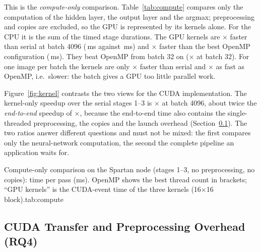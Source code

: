 This is the \emph{compute-only} comparison. Table~\ref{tab:compute} compares only the computation of the hidden layer, the output layer and the argmax; preprocessing and copies are excluded, so the GPU is represented by its kernels alone. For the CPU it is the sum of the timed stage durations. The GPU kernels are $\times$ faster than serial at batch 4096 (\,ms against \,ms) and $\times$ faster than the best OpenMP configuration (\,ms). They beat OpenMP from batch 32 on ($\times$ at batch 32). For one image per batch the kernels are only $\times$ faster than serial and $\times$ as fast as OpenMP, i.e.\ slower: the batch gives a GPU too little parallel work.

Figure~\ref{fig:kernel} contrasts the two views for the CUDA implementation. The kernel-only speedup over the serial stages 1--3 is $\times$ at batch 4096, about twice the \emph{end-to-end} speedup of $\times$, because the end-to-end time also contains the single-threaded preprocessing, the copies and the launch overhead (Section~\ref{sec:overhead}). The two ratios answer different questions and must not be mixed: the first compares only the neural-network computation, the second the complete pipeline an application waits for.

\begin{widetable}{Compute-only comparison on the Spartan node (stages 1--3, no preprocessing, no copies): time per pass (ms). OpenMP shows the best thread count in brackets; ``GPU kernels'' is the CUDA-event time of the three kernels (16$\times$16 block).}{tab:compute}

\end{widetable}


\subsection{CUDA Transfer and Preprocessing Overhead (RQ4)}\label{sec:overhead}

